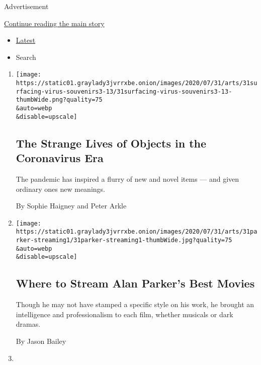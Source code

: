 Advertisement

\protect\hyperlink{after-mid1}{Continue reading the main story}

\begin{itemize}
\tightlist
\item
  \protect\hyperlink{stream-panel}{Latest}
\item
  Search
\end{itemize}

\begin{enumerate}
\def\labelenumi{\arabic{enumi}.}
\item
  \href{/2020/08/01/arts/design/virus-design-objects.html}{}

  \texttt{[image: https://static01.graylady3jvrrxbe.onion/images/2020/07/31/arts/31surfacing-virus-souvenirs3-13/31surfacing-virus-souvenirs3-13-thumbWide.png?quality=75\\\&auto=webp\\\&disable=upscale]}

  \hypertarget{the-strange-lives-of-objects-in-the-coronavirus-era}{%
  \subsection{The Strange Lives of Objects in the Coronavirus
  Era}\label{the-strange-lives-of-objects-in-the-coronavirus-era}}

  The pandemic has inspired a flurry of new and novel items --- and
  given ordinary ones new meanings.

  By Sophie Haigney and Peter Arkle
\item
  \href{/2020/07/31/movies/alan-parker-stream.html}{}

  \texttt{[image: https://static01.graylady3jvrrxbe.onion/images/2020/07/31/arts/31parker-streaming1/31parker-streaming1-thumbWide.jpg?quality=75\\\&auto=webp\\\&disable=upscale]}

  \hypertarget{where-to-stream-alan-parkers-best-movies}{%
  \subsection{Where to Stream Alan Parker's Best
  Movies}\label{where-to-stream-alan-parkers-best-movies}}

  Though he may not have stamped a specific style on his work, he
  brought an intelligence and professionalism to each film, whether
  musicals or dark dramas.

  By Jason Bailey
\item
  \href{/2020/07/31/arts/music/beyonce-black-is-king.html}{}


\end{enumerate}

